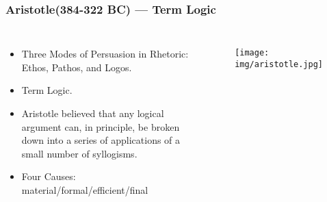 \documentclass[UTF8,11pt,colorlinks,compress,openany]{beamer}%
\begin{document}
\begin{frame}\frametitle{Aristotle(384-322 BC) --- Term Logic}
	\begin{columns}
			\begin{itemize}
				\item Three Modes of Persuasion in Rhetoric: Ethos, Pathos, and Logos.
				\item Term Logic.
				\item Aristotle believed that any logical argument can, in principle, be broken down into a series of applications of a small number of syllogisms.
				\item Four Causes: material/formal/efficient/final
			\end{itemize}
			\begin{figure}
				\texttt{[image: img/aristotle.jpg]}
			\end{figure}
	\end{columns}
\end{frame}
\end{document}
